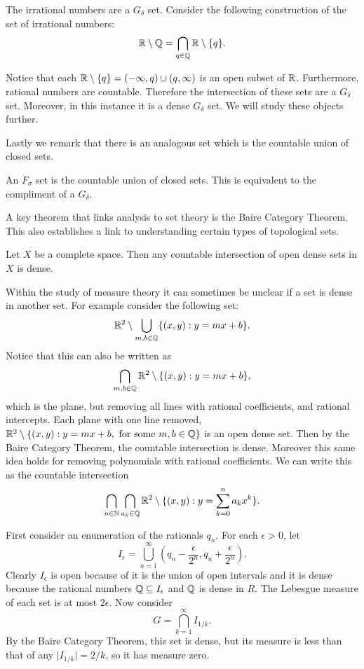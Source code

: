 \begin{example}
    The irrational numbers are a $G_\delta$ set.  Consider the following construction of the set of irrational numbers:
    $$\mathbb{R} \setminus \mathbb{Q} = \bigcap_{q \in \mathbb{Q}}\mathbb{R} \setminus \{q\}.$$
\end{example}
Notice that each $\mathbb{R}\setminus \{q\} = (-\infty, q) \cup (q, \infty)$ is an open subset of $\mathbb{R}$.  Furthermore, rational numbers are countable.  Therefore the intersection of these sets are a $G_\delta$ set.  Moreover, in this instance it is a dense $G_\delta$ set.  We will study these objects further.  

Lastly we remark that there is an analogous set which is the countable union of closed sets.
\begin{definition}
    An $F_\sigma$ set is the countable union of closed sets.  This is equivalent to the compliment of a $G_\delta$.  
\end{definition}

A key theorem that links analysis to set theory is the Baire Category Theorem.  This also establishes a link to understanding certain types of topological sets.  
\begin{theorem}
    Let $X$ be a complete space.  Then any countable intersection of open dense sets in $X$ is dense.  
\end{theorem}

Within the study of measure theory it can sometimes be unclear if a set is dense in another set.  For example consider the following set: 
$$\mathbb{R}^2 \setminus \bigcup_{m,b \in \mathbb{Q}} \{(x,y): y=mx + b\}.$$
Notice that this can also be written as $$\bigcap_{m,b \in \mathbb{Q}} \mathbb{R}^2 \setminus \{(x,y): y=mx+b\}, $$ which is the plane, but removing all lines with rational coefficients, and rational intercepts.  Each plane with one line removed, $\mathbb{R}^2 \setminus \{(x,y) : y=mx+b, \text{ for some } m,b \in \mathbb{Q}\}$ is an open dense set.  Then by the Baire Category Theorem, the countable intersection is dense.  Moreover this same idea holds for removing polynomials with rational coefficients.  We can write this as the countable intersection 
$$\bigcap_{n\in \mathbb{N}}\bigcap_{a_k \in \mathbb{Q}}\mathbb{R}^2 \setminus \{(x,y): y = \sum_{k=0}^n a_kx^k\}.$$


\begin{example}
     First consider an enumeration of the rationals $q_n.$  For each $\epsilon > 0$, let $$I_\epsilon = \bigcup_{n=1}^\infty (q_n - \frac{\epsilon}{2^n}, q_n + \frac{\epsilon}{2^n}).$$  Clearly $I_\epsilon$ is open because of it is the union of open intervals and it is dense because the rational numbers $\mathbb{Q} \subseteq I_\epsilon$ and $\mathbb{Q}$ is dense in $R$.  The Lebesgue measure of each set is at most $2\epsilon$.  Now consider $$G = \bigcap_{k=1}^\infty I_{1/k}.$$  By the Baire Category Theorem, this set is dense, but its measure is less than that of any $\vert I_{1/k} \vert = 2/k $, so it has measure zero.
\end{example}

